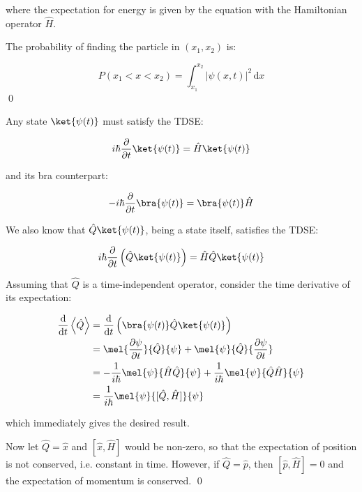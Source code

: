 \documentclass[12pt]{article}
\begin{document}
where the expectation for energy is given by the equation with the Hamiltonian operator $\hat{H}$.

The probability of finding the particle in $(x_{1}, x_{2})$ is:

\begin{equation}
    P(x_{1} < x < x_{2}) = \int_{x_{1}}^{x_{2}} \left| \psi(x,t) \right|^{2} \, \mathrm{d}x
\end{equation}
\qed


Any state $\ket{\psi(t)}$ must satisfy the TDSE:

\begin{equation}
    i\hbar \frac{\partial}{\partial t} \ket{\psi(t)} = \hat{H} \ket{\psi(t)}
\end{equation}

and its bra counterpart:

\begin{equation}
    -i\hbar \frac{\partial}{\partial t} \bra{\psi(t)} = \bra{\psi(t)} \hat{H}
\end{equation}

We also know that $\hat{Q} \ket{\psi(t)}$, being a state itself, satisfies the TDSE:

\begin{equation}
    i\hbar \frac{\partial}{\partial t} \left( \hat{Q} \ket{\psi(t)} \right) = \hat{H} \hat{Q} \ket{\psi(t)}
\end{equation}

Assuming that $\hat{Q}$ is a time-independent operator, consider the time derivative of its expectation:

\begin{equation}
\begin{split}
    \frac{\mathrm{d}}{\mathrm{d}t} \left\langle \hat{Q} \right\rangle &= \frac{\mathrm{d}}{\mathrm{d}t} \left( \bra{\psi(t)} \hat{Q} \ket{\psi(t)} \right) \\
    &= \mel{\frac{\partial \psi}{\partial t}}{\hat{Q}}{\psi} + \mel{\psi}{\hat{Q}}{\frac{\partial \psi}{\partial t}} \\
    &= -\frac{1}{i\hbar} \mel{\psi}{\hat{H} \hat{Q}}{\psi} + \frac{1}{i\hbar} \mel{\psi}{\hat{Q} \hat{H}}{\psi} \\
    &= \frac{1}{i\hbar} \mel{\psi}{[\hat{Q}, \hat{H}]}{\psi}
\end{split}
\end{equation}

which immediately gives the desired result.

Now let $\hat{Q} = \hat{x}$ and $[\hat{x}, \hat{H}]$ would be non-zero, so that the expectation of position is not conserved, i.e. constant in time. However, if $\hat{Q} = \hat{p}$, then $[\hat{p}, \hat{H}] = 0$ and the expectation of momentum is conserved.
\qed
\end{document}
